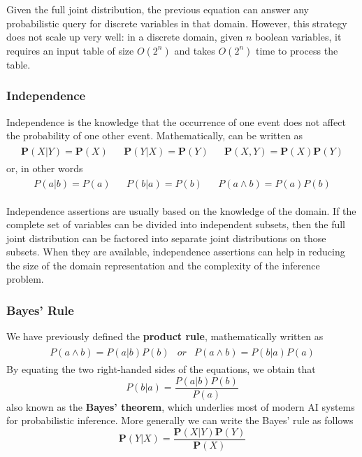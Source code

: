 \documentclass{article}
\begin{document}
Given the full joint distribution, the previous equation can answer any probabilistic query for discrete variables in that domain. However, this strategy does not scale up very well: in a discrete domain, given $n$ boolean variables, it requires an input table of size $O(2^n)$ and takes $O(2^n)$ time to process the table.

\subsubsection{Independence}
Independence is the knowledge that the occurrence of one event does not affect the probability of one other event. Mathematically, can be written as
\begin{align*}
    \begin{array}{ccccc}
        \textbf{P}(X|Y) = \textbf{P}(X) & & \textbf{P}(Y|X) = \textbf{P}(Y) & &\textbf{P}(X, Y) = \textbf{P}(X)\textbf{P}(Y)
    \end{array}
\end{align*}
or, in other words
\begin{align*}
    \begin{array}{ccccc}
        P(a|b) = P(a) & & P(b|a) = P(b) & & P(a \land b) = P(a)P(b)
    \end{array}
\end{align*}

Independence assertions are usually based on the knowledge of the domain. If the complete set of variables can be divided into independent subsets, then the full joint distribution can be factored into separate joint distributions on those subsets. When they are available, independence assertions can help in reducing the size of the domain representation and the complexity of the inference problem.

\subsubsection{Bayes' Rule}
We have previously defined the \textbf{product rule}, mathematically written as
\begin{align*}
    \begin{array}{ccc}
        P(a\land b) = P(a|b)P(b) & or & P(a\land b) = P(b|a)P(a)
    \end{array}
\end{align*}
By equating the two right-handed sides of the equations, we obtain that
$$P(b|a) = \frac{P(a|b)P(b)}{P(a)}$$
also known as the \textbf{Bayes' theorem}, which underlies most of modern AI systems for probabilistic inference. More generally we can write the Bayes' rule as follows
$$\textbf{P}(Y|X) = \frac{\textbf{P}(X|Y)\textbf{P}(Y)}{\textbf{P}(X)}$$
\end{document}
